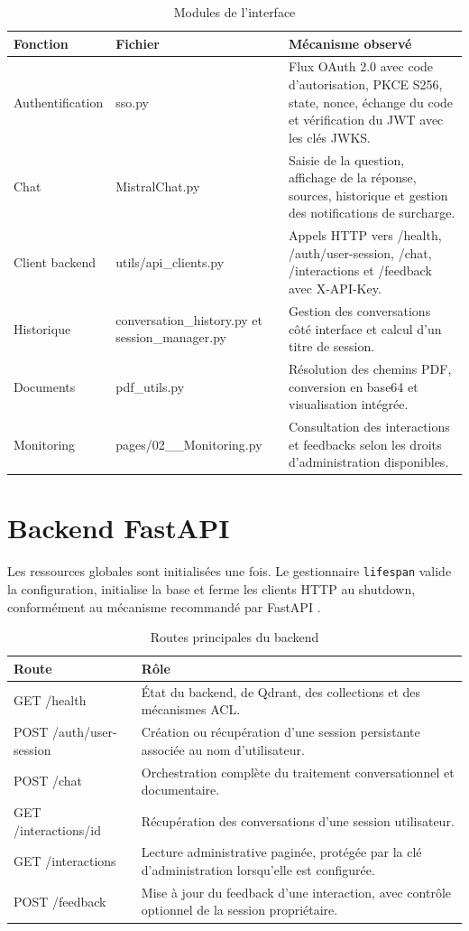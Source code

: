 \begin{table}[H]
\centering
\caption{Modules de l’interface}
\label{tab:ui_ch6}
\begin{tabular}{p{2.7cm}p{3.2cm}p{7.2cm}}
\toprule
\textbf{Fonction} & \textbf{Fichier} & \textbf{Mécanisme observé} \\
\midrule
Authentification & sso.py & Flux OAuth 2.0 avec code d’autorisation, PKCE S256, state, nonce, échange du code et vérification du JWT avec les clés JWKS. \\
Chat & MistralChat.py & Saisie de la question, affichage de la réponse, sources, historique et gestion des notifications de surcharge. \\
Client backend & utils/api\_clients.py & Appels HTTP vers /health, /auth/user-session, /chat, /interactions et /feedback avec X-API-Key. \\
Historique & conversation\_history.py et session\_manager.py & Gestion des conversations côté interface et calcul d’un titre de session. \\
Documents & pdf\_utils.py & Résolution des chemins PDF, conversion en base64 et visualisation intégrée. \\
Monitoring & pages/02\_\_Monitoring.py & Consultation des interactions et feedbacks selon les droits d’administration disponibles. \\
\bottomrule
\end{tabular}
\end{table}

\section{Backend FastAPI}
Les ressources globales sont initialisées une fois. Le gestionnaire \texttt{lifespan} valide la configuration, initialise la base et ferme les clients HTTP au shutdown, conformément au mécanisme recommandé par FastAPI \citep{FastAPILifespan2026}.

\begin{table}[H]
\centering
\caption{Routes principales du backend}
\label{tab:routes_ch6}
\begin{tabular}{p{4.3cm}p{8.8cm}}
\toprule
\textbf{Route} & \textbf{Rôle} \\
\midrule
GET /health & État du backend, de Qdrant, des collections et des mécanismes ACL. \\
POST /auth/user-session & Création ou récupération d’une session persistante associée au nom d’utilisateur. \\
POST /chat & Orchestration complète du traitement conversationnel et documentaire. \\
GET /interactions/{id} & Récupération des conversations d’une session utilisateur. \\
GET /interactions & Lecture administrative paginée, protégée par la clé d’administration lorsqu’elle est configurée. \\
POST /feedback & Mise à jour du feedback d’une interaction, avec contrôle optionnel de la session propriétaire. \\
\bottomrule
\end{tabular}
\end{table}